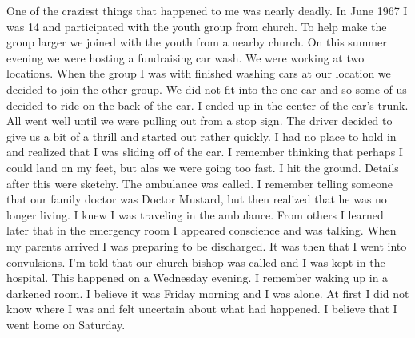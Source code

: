 One of the craziest things that happened to me was nearly deadly. In June 1967 I was 14 and participated with the youth group from church. To help make the group larger we joined with the youth from a nearby church. 
On this summer evening we were hosting a fundraising car wash. We were working at two locations. When the group I was with finished washing cars at our location we decided to join the other group. We did not fit into the one car and so some of us decided to ride on the back of the car. I ended up in the center of the car's trunk. 
All went well until we were pulling out from a stop sign. The driver decided to give us a bit of a thrill and started out rather quickly. I had no place to hold in and realized that I was sliding off of the car. I remember thinking that perhaps I could land on my feet, but alas we were going too fast. I hit the ground. Details after this were sketchy. The ambulance was called. I remember telling someone that our family doctor was Doctor Mustard, but then realized that he was no longer living. I knew I was traveling in the ambulance. 
From others I learned later that in the emergency room I appeared conscience and was talking. When my parents arrived I was preparing to be discharged. It was then that I went into convulsions. I'm told that our church bishop was called and I was kept in the hospital. This happened on a Wednesday evening. I remember waking up in a darkened room. I believe it was Friday morning and I was alone. At first I did not know where I was and felt uncertain about what had happened. I believe that I went home on Saturday.





